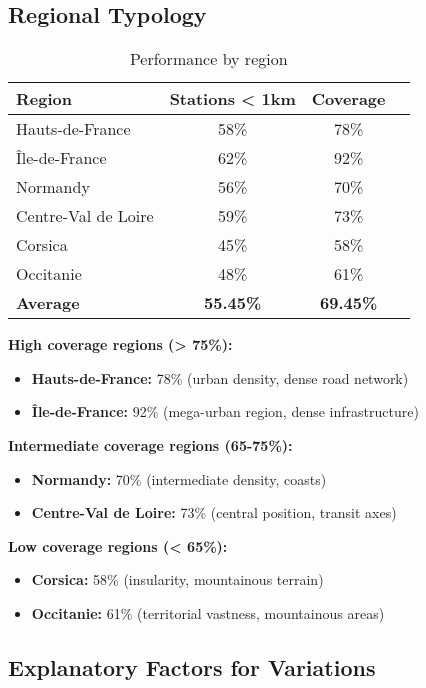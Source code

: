 \documentclass[12pt,a4paper]{report}
\begin{document}
\subsection{Regional Typology}

\begin{table}[H]
\centering
\caption{Performance by region}
\begin{tabular}{|l|c|c|c|}
\hline
\textbf{Region} & \textbf{Stations < 1km} & \textbf{Coverage} \\
\hline
Hauts-de-France & 58\% & 78\% \\
Île-de-France & 62\% & 92\%  \\
Normandy & 56\% & 70\% \\
Centre-Val de Loire & 59\% & 73\% \\
Corsica & 45\% & 58\% \\
Occitanie & 48\% & 61\% \\
\hline
\textbf{Average} & \textbf{55.45\%} & \textbf{69.45\%}  \\
\hline
\end{tabular}
\label{tab:performance-regionale}
\end{table}

\textbf{High coverage regions (> 75\%):}
\begin{itemize}
    \item \textbf{Hauts-de-France:} 78\% (urban density, dense road network)
    \item \textbf{Île-de-France:} 92\% (mega-urban region, dense infrastructure)
\end{itemize}

\textbf{Intermediate coverage regions (65-75\%):}
\begin{itemize}
    \item \textbf{Normandy:} 70\% (intermediate density, coasts)
    \item \textbf{Centre-Val de Loire:} 73\% (central position, transit axes)
\end{itemize}

\textbf{Low coverage regions (< 65\%):}
\begin{itemize}
    \item \textbf{Corsica:} 58\% (insularity, mountainous terrain)
    \item \textbf{Occitanie:} 61\% (territorial vastness, mountainous areas)
\end{itemize}

\subsection{Explanatory Factors for Variations}
\end{document}
